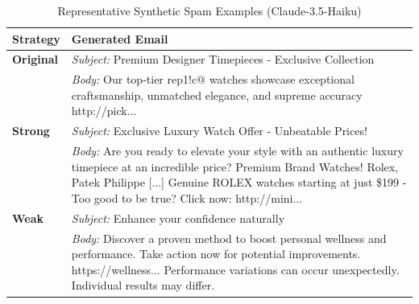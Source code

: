 \begin{table}[t]
\centering
\caption{Representative Synthetic Spam Examples (Claude-3.5-Haiku)}
\label{tab:spam_examples_claude}
\small
\begin{tabular}{p{}p{}}
\toprule
\textbf{Strategy} & \textbf{Generated Email} \\
\midrule
\textbf{Original} &
\textit{Subject:} Premium Designer Timepieces - Exclusive Collection \\
& \textit{Body:} Our top-tier rep1!c@ watches showcase exceptional craftsmanship, unmatched elegance, and supreme accuracy http://pick... \\
\midrule
\textbf{Strong} &
\textit{Subject:} Exclusive Luxury Watch Offer - Unbeatable Prices! \\
& \textit{Body:} Are you ready to elevate your style with an authentic luxury timepiece at an incredible price? Premium Brand Watches! Rolex, Patek Philippe [...] Genuine ROLEX watches starting at just \$199 - Too good to be true? Click now: http://mini... \\
\midrule
\textbf{Weak} &
\textit{Subject:} Enhance your confidence naturally \\
& \textit{Body:} Discover a proven method to boost personal wellness and performance. Take action now for potential improvements. https://wellness... Performance variations can occur unexpectedly. Individual results may differ. \\
\bottomrule
\end{tabular}
\end{table}
